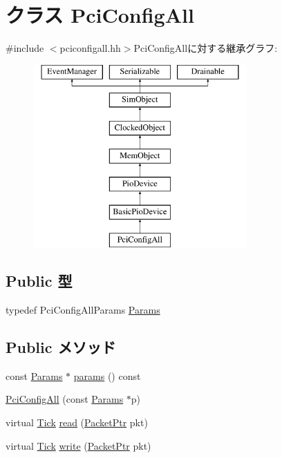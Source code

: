 \hypertarget{classPciConfigAll}{
\section{クラス PciConfigAll}
\label{classPciConfigAll}
}


{\ttfamily \#include $<$pciconfigall.hh$>$}PciConfigAllに対する継承グラフ:\begin{figure}[H]
\begin{center}
\leavevmode
\includegraphics[height=7cm]{classPciConfigAll}
\end{center}
\end{figure}
\subsection*{Public 型}
\begin{DoxyCompactItemize}
\item 
typedef PciConfigAllParams \hyperlink{classPciConfigAll_a0488eba2a71c6661fef314d8ded28416}{Params}
\end{DoxyCompactItemize}
\subsection*{Public メソッド}
\begin{DoxyCompactItemize}
\item 
const \hyperlink{classPciConfigAll_a0488eba2a71c6661fef314d8ded28416}{Params} $\ast$ \hyperlink{classPciConfigAll_acd3c3feb78ae7a8f88fe0f110a718dff}{params} () const 
\item 
\hyperlink{classPciConfigAll_a618458d1056b88674814a45722d1474e}{PciConfigAll} (const \hyperlink{classPciConfigAll_a0488eba2a71c6661fef314d8ded28416}{Params} $\ast$p)
\item 
virtual \hyperlink{base_2types_8hh_a5c8ed81b7d238c9083e1037ba6d61643}{Tick} \hyperlink{classPciConfigAll_a613ec7d5e1ec64f8d21fec78ae8e568e}{read} (\hyperlink{classPacket}{PacketPtr} pkt)
\item 
virtual \hyperlink{base_2types_8hh_a5c8ed81b7d238c9083e1037ba6d61643}{Tick} \hyperlink{classPciConfigAll_a4cefab464e72b5dd42c003a0a4341802}{write} (\hyperlink{classPacket}{PacketPtr} pkt)
\end{DoxyCompactItemize}


